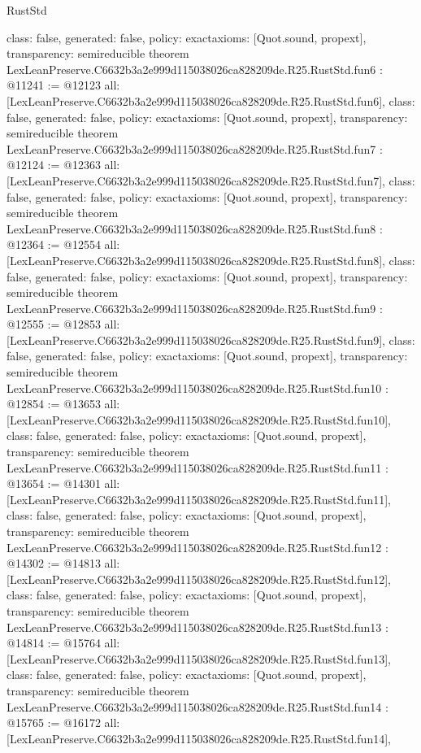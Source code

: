 \begin{lexlean}{RustStd}
\begin{coremodule}
{  class: false,
  generated: false,
  policy: exact{axioms: [Quot.sound, propext]},
  transparency: semireducible
}
theorem LexLeanPreserve.C6632b3a2e999d115038026ca828209de.R25.RustStd.fun6 : @11241 := @12123 {
  all: [LexLeanPreserve.C6632b3a2e999d115038026ca828209de.R25.RustStd.fun6],
  class: false,
  generated: false,
  policy: exact{axioms: [Quot.sound, propext]},
  transparency: semireducible
}
theorem LexLeanPreserve.C6632b3a2e999d115038026ca828209de.R25.RustStd.fun7 : @12124 := @12363 {
  all: [LexLeanPreserve.C6632b3a2e999d115038026ca828209de.R25.RustStd.fun7],
  class: false,
  generated: false,
  policy: exact{axioms: [Quot.sound, propext]},
  transparency: semireducible
}
theorem LexLeanPreserve.C6632b3a2e999d115038026ca828209de.R25.RustStd.fun8 : @12364 := @12554 {
  all: [LexLeanPreserve.C6632b3a2e999d115038026ca828209de.R25.RustStd.fun8],
  class: false,
  generated: false,
  policy: exact{axioms: [Quot.sound, propext]},
  transparency: semireducible
}
theorem LexLeanPreserve.C6632b3a2e999d115038026ca828209de.R25.RustStd.fun9 : @12555 := @12853 {
  all: [LexLeanPreserve.C6632b3a2e999d115038026ca828209de.R25.RustStd.fun9],
  class: false,
  generated: false,
  policy: exact{axioms: [Quot.sound, propext]},
  transparency: semireducible
}
theorem LexLeanPreserve.C6632b3a2e999d115038026ca828209de.R25.RustStd.fun10 : @12854 := @13653 {
  all: [LexLeanPreserve.C6632b3a2e999d115038026ca828209de.R25.RustStd.fun10],
  class: false,
  generated: false,
  policy: exact{axioms: [Quot.sound, propext]},
  transparency: semireducible
}
theorem LexLeanPreserve.C6632b3a2e999d115038026ca828209de.R25.RustStd.fun11 : @13654 := @14301 {
  all: [LexLeanPreserve.C6632b3a2e999d115038026ca828209de.R25.RustStd.fun11],
  class: false,
  generated: false,
  policy: exact{axioms: [Quot.sound, propext]},
  transparency: semireducible
}
theorem LexLeanPreserve.C6632b3a2e999d115038026ca828209de.R25.RustStd.fun12 : @14302 := @14813 {
  all: [LexLeanPreserve.C6632b3a2e999d115038026ca828209de.R25.RustStd.fun12],
  class: false,
  generated: false,
  policy: exact{axioms: [Quot.sound, propext]},
  transparency: semireducible
}
theorem LexLeanPreserve.C6632b3a2e999d115038026ca828209de.R25.RustStd.fun13 : @14814 := @15764 {
  all: [LexLeanPreserve.C6632b3a2e999d115038026ca828209de.R25.RustStd.fun13],
  class: false,
  generated: false,
  policy: exact{axioms: [Quot.sound, propext]},
  transparency: semireducible
}
theorem LexLeanPreserve.C6632b3a2e999d115038026ca828209de.R25.RustStd.fun14 : @15765 := @16172 {
  all: [LexLeanPreserve.C6632b3a2e999d115038026ca828209de.R25.RustStd.fun14],
}
\end{coremodule}
\end{lexlean}

